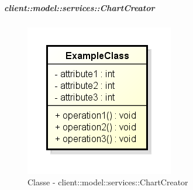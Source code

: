 		\subparagraph{client::model::services::ChartCreator} %
		\label{subp:chartcreator}
			\begin{figure}[htbp]
				\centering
				\centerline{\includegraphics[scale=0.7]{./images/client/classes/example_class.png}}
				\caption{Classe - client::model::services::ChartCreator}
			\end{figure}
